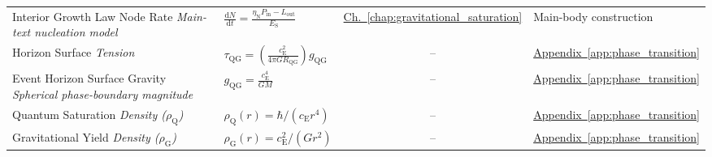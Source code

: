 \begin{longtable}{@{} p{4.5cm} p{6cm} c p{4cm} @{}}
{\raggedright Interior Growth Law Node Rate \newline \textit{Main-text nucleation model}\par} & {\raggedright $\frac{\mathrm{d}N}{\mathrm{d}t} = \frac{\eta_{\mathrm{N}} P_{\mathrm{in}} - L_{\mathrm{out}}}{E_{\mathrm{S}}}$\par} & \hyperref[chap:gravitational_saturation]{Ch.~\ref*{chap:gravitational_saturation}} & {\raggedright Main-body construction\par} \\

{\raggedright Horizon Surface \newline \textit{Tension}\par} & {\raggedright $\tau_{\mathrm{QG}} = \left(\frac{c_{\mathrm{E}}^2}{4\pi G R_{\mathrm{QG}}}\right) g_{\mathrm{QG}}$\par} & -- & {\raggedright \hyperref[app:phase_transition]{Appendix~\ref*{app:phase_transition}}\par} \\

{\raggedright Event Horizon Surface Gravity \newline \textit{Spherical phase-boundary magnitude}\par} & {\raggedright $g_{\mathrm{QG}} = \frac{c_{\mathrm{E}}^4}{GM}$\par} & -- & {\raggedright \hyperref[app:phase_transition]{Appendix~\ref*{app:phase_transition}}\par} \\

{\raggedright Quantum Saturation \newline \textit{Density ($\rho_{\mathrm{Q}}$)}\par} & {\raggedright $\rho_{\mathrm Q}(r)=\hbar/(c_{\mathrm E}r^4)$\par} & -- & {\raggedright \hyperref[app:phase_transition]{Appendix~\ref*{app:phase_transition}}\par} \\

{\raggedright Gravitational Yield \newline \textit{Density ($\rho_{\mathrm{G}}$)}\par} & {\raggedright $\rho_{\mathrm G}(r)=c_{\mathrm E}^2/(Gr^2)$\par} & -- & {\raggedright \hyperref[app:phase_transition]{Appendix~\ref*{app:phase_transition}}\par} \\


\end{longtable}

